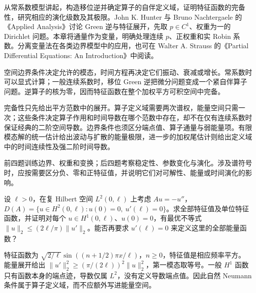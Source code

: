 \ProseParagraphBreak

从常系数模型讲起，构造移位逆并确定算子的自伴定义域，证明特征函数的完备性，研究相应的演化级数及其极限。John K. Hunter 与 Bruno Nachtergaele 的《Applied Analysis》\cite[Section 10.5, pp. 268--272]{Hunter2001Applied}讨论 Green 逆与特征展开，先取 \(p\in C^1\)、权重为一的 Dirichlet 问题。本章将通量作为变量，明确处理连续 \(p\)、正权重和实 Robin 系数。分离变量法在各类边界模型中的应用，也可在 Walter A. Strauss 的《Partial Differential Equations: An Introduction》\cite{Strauss2008Partial}中阅读。





\begin{chaptersummary}
空间边界条件决定允许的模态，时间方程再决定它们振动、衰减或增长。常系数时可以显式计算；一般连续系数时，移位 Green 逆把微分问题变成一个紧自伴算子问题。逆算子的核为零，因而特征函数在整个加权平方可积空间中完备。

\ProseParagraphBreak

完备性只先给出平方范数中的展开。算子定义域需要两次谱权，能量空间只需一次；这些条件决定算子作用和时间导数在哪个范数中存在，却不在仅有连续系数时保证经典的二阶空间导数。边界条件也须区分端点值、算子通量与弱能量项。有限模态解的统一估计给出波动与扩散的能量极限，进一步的加权尾估计则给出定义域中的时间连续性及强二阶时间导数。
\end{chaptersummary}


\BookExercises

前四题训练边界、权重和变换；后四题考察稳定性、参数变化与演化。涉及谱符号时，应按需要区分负、零和正特征值，并说明它们对可解性、能量或时间演化的影响。

\begin{exercise}\label{b2:ex:10-mixed-best-constant}
设 \(\ell>0\)，在复 Hilbert 空间 \(L^2(0,\ell)\) 上考虑 \(Au=-u''\)，\(D(A)=\{u\in H^2(0,\ell):u(0)=0,\ u'(\ell)=0\}\)。求全部特征值及单位特征函数，并证明对每个 \(u\in H^1(0,\ell)\)、\(u(0)=0\)，有最优不等式 \(\|u\|_2\leq(2\ell/\pi)\|u'\|_2\)。能否再要求 \(u'(\ell)=0\) 来定义这里的全部能量函数？
\end{exercise}
\begin{solution}
特征函数为 \(\sqrt{2/\ell}\sin((n+1/2)\pi x/\ell)\)，\(n\geq0\)，特征值是相应频率平方。能量展开给出 \(\|u'\|_2^2\geq(\pi/(2\ell))^2\|u\|_2^2\)，第一模态取等号。一般 \(H^1\) 函数只有函数本身的端点迹，导数仅属 \(L^2\)，没有定义导数端点值。因此自然 Neumann 条件属于算子定义域，而不应额外写进能量空间。
\end{solution}


